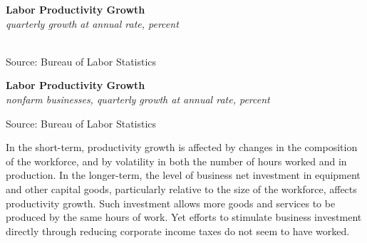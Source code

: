 \documentclass{report}
\makeatletter
\newcommand{\tbllink}[1]{\href{https://raw.githubusercontent.com/bdecon/US-chartbook/master/chartbook/data/#1}{\faTable}}
\newcommand*\short[1]{\expandafter\@gobbletwo\number\numexpr#1\relax}
\newcommand{\sbar}[4]{
		\addplot[ybar stacked, bar width=2.3pt, draw opacity=0, fill=#1] 
			table [x=#2, y=#3, col sep=comma]{#4};}
\newcommand{\absnode}[3]{\node[below right, align=left] at (axis cs: #1,#2) {#3};}
\newcommand{\dateaxisticks}{
		date coordinates in=x, axis line style={draw=none},
		xmax={2023-10-01},
		max space between ticks=40,	    
		xtick={{1990-01-01}, {1992-01-01}, {1994-01-01}, 
			{1996-01-01}, {1998-01-01}, {2000-01-01}, 
			{2002-01-01}, {2004-01-01}, {2006-01-01},
			{2008-01-01}, {2010-01-01}, {2012-01-01}, {2014-01-01},
		    {2016-01-01}, {2018-01-01}, {2020-01-01}, {2022-01-01}, 
		    {2024-01-01}, {2026-01-01}},
		minor xtick={{1989-01-01}, {1991-01-01}, {1993-01-01},
			{1995-01-01}, {1997-01-01}, {1999-01-01}, 
			{2001-01-01}, {2003-01-01}, {2005-01-01}, {2007-01-01},
		    {2009-01-01}, {2011-01-01}, {2013-01-01}, {2015-01-01},
		    {2017-01-01}, {2019-01-01}, {2021-01-01}, {2023-01-01}, 
		    {2025-01-01}, {2027-01-01}},
		enlarge y limits={0.06}, enlarge x limits={0.01},
		}
\newcommand{\shdateaxisticks}{
		date coordinates in=x, axis line style={draw=none},
		xmax={2023-10-01},
		max space between ticks=40,	    
		xtick={{1990-01-01}, {1995-01-01}, {2000-01-01}, 
			{2005-01-01}, {2010-01-01}, {2015-01-01}, {2020-01-01}},
		minor xtick={},
		enlarge y limits={0.06}, enlarge x limits={0.01},
		}
\newcommand{\bbar}[2]{extra #1 ticks = {{#2}}, extra #1 tick labels = ,
		extra #1 tick style = {grid=major, grid style={thick, black!25}},}
\newcommand{\stdline}[4]{\addplot[very thick, no markers, color=#1] 
		table [x=#2, y=#3, col sep=comma] {#4};	}
\newcommand{\thickline}[4]{\addplot[ultra thick, no markers, color=#1] 
		table [x=#2, y=#3, col sep=comma] {#4};	}
\newcommand{\rbars}{
		\fill[color=black!10] (axis cs:{1990-07-01},\pgfkeysvalueof{/pgfplots/ymin}) rectangle 
			(axis cs:{1991-03-01}, \pgfkeysvalueof{/pgfplots/ymax});
		\fill[color=black!10] (axis cs:{2007-12-01},\pgfkeysvalueof{/pgfplots/ymin}) rectangle 
			(axis cs:{2009-07-01}, \pgfkeysvalueof{/pgfplots/ymax});
		\fill[color=black!10] (axis cs:{2001-03-01},\pgfkeysvalueof{/pgfplots/ymin}) rectangle 
			(axis cs:{2001-11-01}, \pgfkeysvalueof{/pgfplots/ymax});
		\fill[color=black!10] (axis cs:{2020-02-01},\pgfkeysvalueof{/pgfplots/ymin}) rectangle 
			(axis cs:{2020-05-01}, \pgfkeysvalueof{/pgfplots/ymax});}
\makeatother
\begin{document}
{\begin{minipage}{0.76\textwidth}
\begin{minipage}{0.39\textwidth}
\small 
\end{minipage} \hfill \begin{minipage}{0.54\textwidth}
\normalsize \textbf{Labor Productivity Growth}\\
\footnotesize{\textit{quarterly growth at annual rate, percent}}\\
\hspace*{-2mm} \\
\footnotesize{Source: Bureau of Labor Statistics} \hfill \tbllink{prod_st_lt.csv}
\end{minipage} 
\vspace{1mm}


\vspace{1.0mm}

\normalsize \textbf{Labor Productivity Growth}\\
\footnotesize{\textit{nonfarm businesses, quarterly growth at annual rate, percent}}
\vspace{2.6cm}

\hspace{4mm} 

\footnotesize{Source: Bureau of Labor Statistics} \hfill \tbllink{lprod.csv}
\vspace{1.5mm}

\small In the short-term, productivity growth is affected by changes in the composition of the workforce, and by volatility in both the number of hours worked and in production. In the longer-term, the level of business net investment in equipment and other capital goods, particularly relative to the size of the workforce, affects productivity growth. Such investment allows more goods and services to be produced by the same hours of work. Yet efforts to stimulate business investment directly through reducing corporate income taxes do not seem to have worked. 


\end{minipage}}
\end{document}
